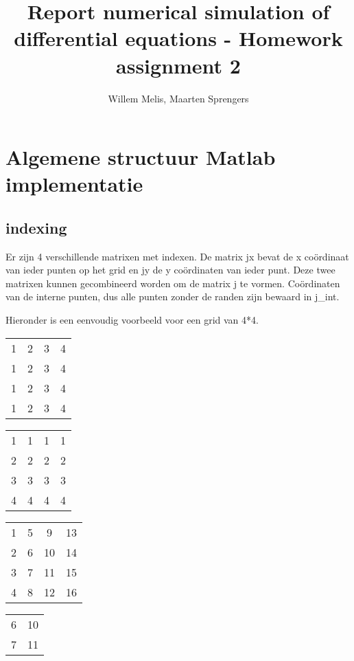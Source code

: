 \documentclass[11pt]{article} %
\title{Report numerical simulation of differential equations - Homework assignment 2}
\author{Willem Melis, Maarten Sprengers}
\begin{document}
\maketitle
\newpage
\tableofcontents
\newpage

\section{Algemene structuur Matlab implementatie}
\subsection{indexing}
Er zijn 4 verschillende matrixen met indexen. De matrix jx bevat de x coördinaat van ieder punten op het grid en jy de y coördinaten van ieder punt. Deze twee matrixen kunnen gecombineerd worden om de matrix j te vormen. Coördinaten van de interne punten, dus alle punten zonder de randen zijn bewaard in j\_int.

Hieronder is een eenvoudig voorbeeld voor een grid van 4*4.
\begin{center}
	\begin{tabular}{ c c c c }
		1 & 2 & 3 & 4 \\
		1 & 2 & 3 & 4 \\
		1 & 2 & 3 & 4 \\
		1 & 2 & 3 & 4
	
	\end{tabular}
\end{center}

\begin{center}
	\begin{tabular}{ c c c c }
		1 & 1 & 1 & 1 \\
		2 & 2 & 2 & 2 \\
		3 & 3 & 3 & 3 \\
		4 & 4 & 4 & 4
	\end{tabular}
\end{center}

\begin{center}
	\begin{tabular}{ c c c c }
		1 & 5 & 9  & 13 \\
		2 & 6 & 10 & 14 \\
		3 & 7 & 11 & 15 \\
		4 & 8 & 12 & 16
	\end{tabular}
\end{center}

\begin{center}
	\begin{tabular}{ c  c }

		6 & 10 \\
		7 & 11 \\

	\end{tabular}
\end{center}
\end{document}
